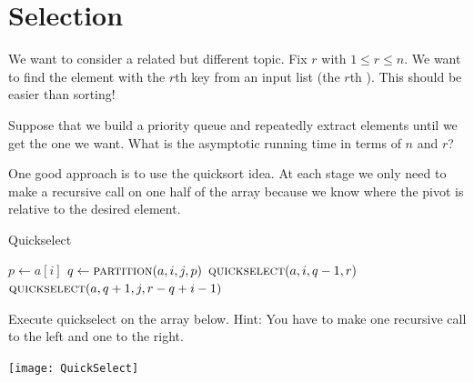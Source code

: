 \section{Selection}
We want to consider a related but different topic. Fix $r$ with $1\leq r \leq n$. 
We want to find the element with the $r$th key from an input list (the $r$th ). 
This should be easier than sorting! 

\begin{Boxample}[5]
Suppose that we build a priority queue and repeatedly extract elements until we get the one we want.
What is the asymptotic running time in terms of $n$ and $r$?

\end{Boxample}

One good approach is to use the quicksort idea. At each stage we only need to 
make a recursive call on one half of the array because we know where the pivot 
is relative to the desired element. 


\begin{algorithm}[H]
  \caption{Quickselect
     \label{alg:quickselect}}
\begin{algorithmic}[0]
		\State $p \gets a[i]$ 
		\State $q \gets  \Call{partition}{a, i,j,p}$ 
			\State {}
			\State $\Call{quickselect}{a,i,q-1,r}$ 
		\Else{}
			\State $\Call{quickselect}{a,q+1,j,r-q+i-1}$ 
		\EndIf
	\EndIf
\EndFunction  
\end{algorithmic}
\end{algorithm}

\begin{Boxample}[1]
Execute quickselect on the array below. Hint: You have to make one recursive call to the left and one to the right.
\begin{center}
\texttt{[image: QuickSelect]} 
\end{center}
\end{Boxample}



